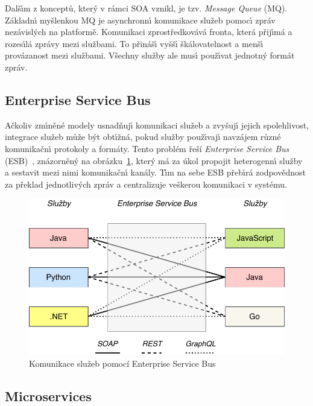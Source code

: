 Dalš\'{\i}m z konceptů, kter\'y v rámci \gls{SOA} vznikl, je tzv. \textit{Message Queue} (\gls{MQ}).
Základn\'{\i} myšlenkou \gls{MQ} %
je asynchronn\'{\i} komunikace služeb pomoc\'{\i} zpráv nezávisl\'ych
na platformě. Komunikaci zprostředkovává fronta, která přij\'{\i}má a rozes\'{\i}lá
zprávy mezi službami. To přináš\'{\i} vyšš\'{\i} škálovatelnost a menš\'{\i} provázanost
mezi službami. Všechny služby ale mus\'{\i} použ\'{\i}vat jednotn\'y formát zpráv.

\subsection{Enterprise Service Bus}

Ačkoliv zm\'{\i}něné modely usnadňuj\'{\i} komunikaci služeb a zvyšuj\'{\i} jejich
spolehlivost, integrace služeb může b\'yt obt\'{\i}žná, pokud služby použ\'{\i}vaj\'{\i}
navzájem různé komunikačn\'{\i} protokoly a formáty. Tento problém řeší \textit{Enterprise Service
Bus} (\gls{ESB})~\cite{chappell2004enterprise}, znázorněn\'y na obrázku~\ref{fig:enterprise-service-bus},
kter\'y má za úkol propojit heterogenn\'{\i} služby a sestavit mezi nimi komunikačn\'{\i} kanály.
T\'{\i}m na sebe \gls{ESB} přeb\'{\i}rá zodpovědnost za překlad jednotliv\'ych zpráv a centralizuje
veškerou komunikaci v systému.

\begin{figure}
    \centering
    \includegraphics[keepaspectratio=true, width=0.6\linewidth]{figures/enterprise-service-bus.pdf}
    \caption{Komunikace služeb pomocí Enterprise Service Bus}
    \label{fig:enterprise-service-bus}
\end{figure}

\subsection{Microservices}\label{sec:microservices}

